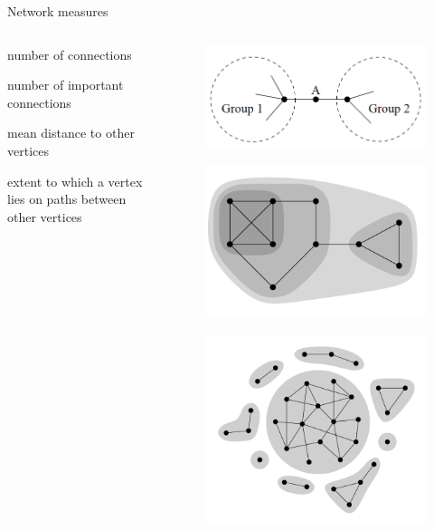 \documentclass[serif, aspectratio=169]{beamer}
\begin{document}
\begin{frame}
{Network measures}

\begin{columns}
\begin{column}{0.6\textwidth}
  \begin{description}
  \item<1-> [Degree of a vertex] number of connections
  \item<2-> [Authority of a vertex] number of important connections
  \item<3-> [Closeness of a vertex] mean distance to other vertices
  \item<4-> [Betweenness of a vertex] extent to which a vertex lies on paths between other vertices
  \item<5-> [Group of vertices]
  \end{description}
\end{column}
\begin{column}{0.4\textwidth}
\begin{figure}
    \includegraphics[width=0.55\linewidth]{figure/betweenness}
\end{figure}
\begin{figure}\vspace{.5 cm}
    \includegraphics[width=0.55\linewidth]{figure/groups}
\end{figure}
\begin{figure}
    \includegraphics[width=0.55\linewidth]{figure/components}
\end{figure}
\end{column}
\end{columns}

\end{frame}
\end{document}
